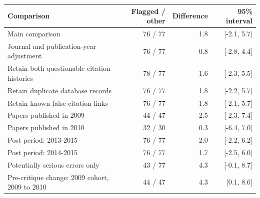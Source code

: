 \begin{tabular}{p{7.0cm}rrr}
\toprule
Comparison & Flagged / other & Difference & 95\% interval \\
\midrule
Main comparison & 76 / 77 & 1.8 & [-2.1, 5.7] \\
Journal and publication-year adjustment & 76 / 77 & 0.8 & [-2.8, 4.4] \\
Retain both questionable citation histories & 78 / 77 & 1.6 & [-2.3, 5.5] \\
Retain duplicate database records & 76 / 77 & 1.8 & [-2.2, 5.7] \\
Retain known false citation links & 76 / 77 & 1.8 & [-2.1, 5.7] \\
Papers published in 2009 & 44 / 47 & 2.5 & [-2.3, 7.4] \\
Papers published in 2010 & 32 / 30 & 0.3 & [-6.4, 7.0] \\
Post period: 2013-2015 & 76 / 77 & 2.0 & [-2.2, 6.2] \\
Post period: 2014-2015 & 76 / 77 & 1.7 & [-2.5, 6.0] \\
Potentially serious errors only & 43 / 77 & 4.3 & [-0.1, 8.7] \\
Pre-critique change: 2009 cohort, 2009 to 2010 & 44 / 47 & 4.3 & [0.1, 8.6] \\
\bottomrule
\end{tabular}

